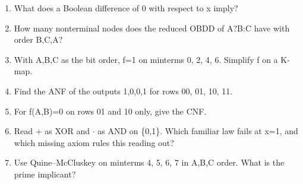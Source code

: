 \documentclass[11pt]{article}
\begin{document}
\begin{keepsection}
\begin{enumerate}
\item What does a Boolean difference of 0 with respect to x imply?
\item How many nonterminal nodes does the reduced OBDD of A?B:C have with order B,C,A?
\item With A,B,C as the bit order, f=1 on minterms 0, 2, 4, 6. Simplify f on a K-map.
\item Find the ANF of the outputs 1,0,0,1 for rows 00, 01, 10, 11.
\item For f(A,B)=0 on rows 01 and 10 only, give the CNF.
\item Read + as XOR and \ensuremath{\cdot} as AND on \{0,1\}. Which familiar law fails at x=1, and which missing axiom rules this reading out?
\item Use Quine–McCluskey on minterms 4, 5, 6, 7 in A,B,C order. What is the prime implicant?
\end{enumerate}

\end{keepsection}
\end{document}

